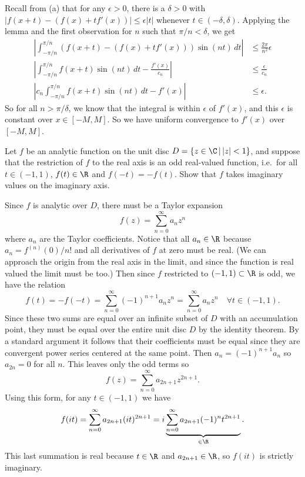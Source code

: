 \documentclass[11pt,letterpaper]{article}
\begin{document}
\begin{solution}
    Recall from (a) that for any $\epsilon>0$, there is a $\delta > 0$ with $|f(x+t)-(f(x)+tf'(x))|\leq \epsilon|t|$ whenever $t\in (-\delta, \delta)$. Applying the lemma and the first observation for $n$ such that $\pi/n < \delta$, we get
    \[\begin{aligned}
        \left|\int^{\pi/n}_{-\pi/n}(f(x+t)-(f(x)+tf'(x)))\sin(nt)\,dt\right| &\leq \frac{2\pi}{n^2}\epsilon\\
        \left|\int^{\pi/n}_{-\pi/n}f(x+t)\sin(nt)\,dt - \frac{f'(x)}{c_n}\right| &\leq \frac{\epsilon}{c_n}\\
        \left|c_n\int^{\pi/n}_{-\pi/n}f(x+t)\sin(nt)\,dt - f'(x)\right| &\leq \epsilon.
    \end{aligned}\]
    So for all $n>\pi/\delta$, we know that the integral is within $\epsilon$ of $f'(x)$, and this $\epsilon$ is constant over $x\in [-M, M]$. So we have uniform convergence to $f'(x)$ over $[-M,M]$.
\end{solution}

\begin{problem}
    Let $f$ be an analytic function on the unit disc $D=\{z\in\C\,|\,|z|<1\}$, and suppose that the restriction of $f$ to the real axis is an odd real-valued function, i.e.\ for all $t\in (-1,1)$, $f(t)\in \R$ and $f(-t)=-f(t)$. Show that $f$ takes imaginary values on the imaginary axis.
\end{problem}

\begin{solution}
    Since $f$ is analytic over $D$, there must be a Taylor expansion
    \[
        f(z)=\sum^\infty_{n=0}a_nz^n
    \] 
    where $a_n$ are the Taylor coefficients. Notice that all $a_n\in \R$ because $a_n=f^{(n)}(0)/n!$ and all derivatives of $f$ at zero must be real. (We can approach the origin from the real axis in the limit, and since the function is real valued the limit must be too.) Then since $f$ restricted to $(-1,1)\subset \R$ is odd, we have the relation
    \[
        f(t)=-f(-t)=\sum^\infty_{n=0}(-1)^{n+1}a_nz^n=\sum^\infty_{n=0}a_nz^n\quad\forall t\in (-1,1).
    \] 
    Since these two sums are equal over an infinite subset of $D$ with an accumulation point, they must be equal over the entire unit disc $D$ by the identity theorem. By a standard argument it follows that their coefficients must be equal since they are convergent power series centered at the same point. Then $a_n=(-1)^{n+1}a_n$ so $a_{2n}=0$ for all $n$. This leaves only the odd terms so
    \[
        f(z)=\sum^\infty_{n=0}a_{2n+1}z^{2n+1}.
    \] 
    Using this form, for any $t\in (-1,1)$ we have
    \[
        f(it)=\sum^\infty_{n=0}a_{2n+1}(it)^{2n+1}=i\underbrace{\sum^\infty_{n=0}a_{2n+1}(-1)^nt^{2n+1}}_{\in\R}.
    \] 
    This last summation is real because $t\in \R$ and $a_{2n+1}\in \R$, so $f(it)$ is strictly imaginary.
\end{solution}
\end{document}
